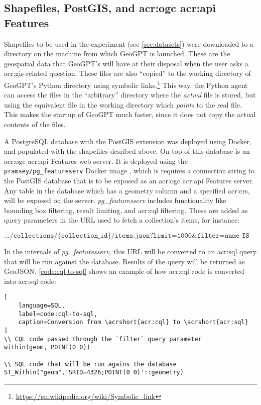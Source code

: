 \subsection[Shapefiles, PostGIS, and OGC API Features]{Shapefiles, PostGIS, and \acrshort{acr:ogc} \acrshort{acr:api} Features}
\label{subsec:postgis-and-oaf-architecture}

Shapefiles to be used in the experiment (see \autoref{sec:datasets}) were downloaded to a directory on the machine from which GeoGPT is launched. These are the geospatial data that GeoGPT's will have at their disposal when the user asks a \acrshort{acr:gis}-related question. These files are also \enquote{copied} to the working directory of GeoGPT's Python directory using symbolic links.\footnote{\url{https://en.wikipedia.org/wiki/Symbolic_link}} This way, the Python agent can access the files in the \enquote{arbitrary} directory where the \textit{actual} file is stored, but using the equivalent file in the working directory which \textit{points} to the real file. This makes the startup of GeoGPT much faster, since it does not copy the actual contents of the files.

A PostgreSQL database with the PostGIS extension was deployed using Docker, and populated with the shapefiles desribed above. On top of this database is an \acrshort{acr:ogc} \acrshort{acr:api} Features web server. It is deployed using the \texttt{pramsey/pg\_featureserv} Docker image \citep{crunchydataCrunchyDataPg_featureserv2024}, which is requires a connection string to the PostGIS database that is to be exposed as an \acrshort{acr:ogc} \acrshort{acr:api} Features server. Any table in the database which has a geometry column and a specified \gls{acr:crs}, will be exposed on the server. \textit{pg\_featuresserv} includes functionality like bounding box filtering, result limiting, and \acrshort{acr:cql} filtering. These are added as query parameters in the URL used to fetch a collection's items, for instance:

$$
    \texttt{.../collections/\{collection\_id\}/items.json?limit=1000\&filter=name IS NOT NULL}
$$

In the internals of \textit{pg\_featuresserv}, this URL will be converted to an \acrshort{acr:sql} query that will be run against the database. Results of the query will be returned as GeoJSON. \autoref{code:cql-to-sql} shows an example of how \acrshort{acr:cql} code is converted into \acrshort{acr:sql} code:

\begin{lstlisting}[
    language=SQL,
    label=code:cql-to-sql,
    caption=Conversion from \acrshort{acr:cql} to \acrshort{acr:sql}
]
\\ CQL code passed through the `filter` query parameter
within(geom, POINT(0 0))

\\ SQL code that will be run agains the database
ST_Within("geom",'SRID=4326;POINT(0 0)'::geometry)
\end{lstlisting}

